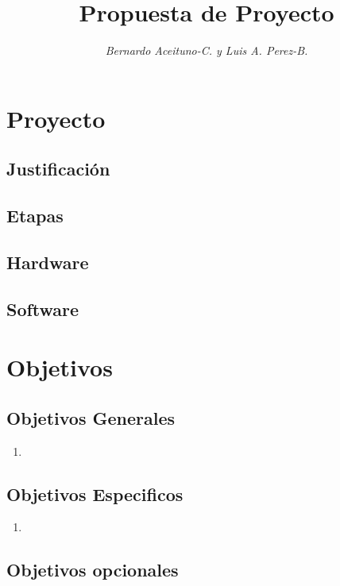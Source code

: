 \documentclass{article}
\title{Propuesta de Proyecto}
\author{\textit{Bernardo Aceituno-C. y Luis A. Perez-B.}}
\date{}
\begin{document}
\maketitle
	
\section{Proyecto}

\subsection{Justificaci\'on}

\subsection{Etapas}

\subsection{Hardware}

\subsection{Software}

\section{Objetivos}

\subsection{Objetivos Generales}

\begin{enumerate}
	\item 
\end{enumerate}

\subsection{Objetivos Especificos}

\begin{enumerate}
	\item 
\end{enumerate}

\subsection{Objetivos opcionales}
\end{document}
